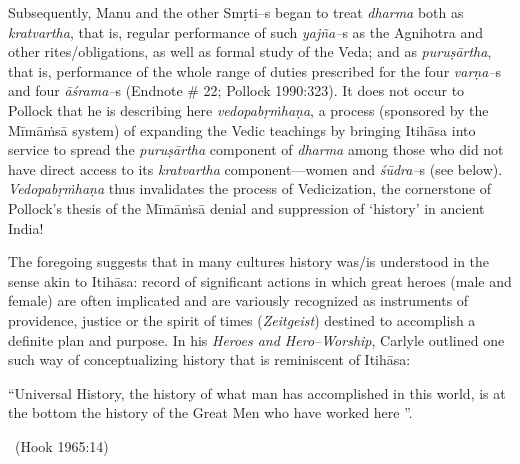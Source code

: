 Subsequently, Manu and the other Smṛti–s began to treat \textit{dharma} both as \textit{kratvartha}, that is, regular performance of such \textit{yajña–}s as the Agnihotra and other rites/obligations, as well as formal study of the Veda; and as \textit{puruṣārtha}, that is, performance of the whole range of duties prescribed for the four \textit{varṇa–}s and four \textit{āśrama–}s (Endnote \# 22; Pollock 1990:323). It does not occur to Pollock that he is describing here \textit{vedopabṛṁhaṇa}, a process (sponsored by the Mīmāṁsā system) of expanding the Vedic teachings by bringing Itihāsa into service to spread the \textit{puruṣārtha} component of \textit{dharma} among those who did not have direct access to its \textit{kratvartha} component—women and \textit{śūdra–}s (see below). \textit{Vedopabṛṁhaṇa} thus invalidates the process of Vedicization, the cornerstone of Pollock’s thesis of the Mīmāṁsā denial and suppression of ‘history’ in ancient India!

The foregoing suggests that in many cultures history was/is understood in the sense akin to Itihāsa: record of significant actions in which great heroes (male and female) are often implicated and are variously recognized as instruments of providence, justice or the spirit of times (\textit{Zeitgeist}) destined to accomplish a definite plan and purpose. In his \textit{Heroes and Hero–Worship}, Carlyle outlined one such way of conceptualizing history that is reminiscent of Itihāsa:

\begin{myquote}
“Universal History, the history of what man has accomplished in this world, is at the bottom the history of the Great Men who have worked here ”. 

~\hfill (Hook 1965:14)
\end{myquote}

